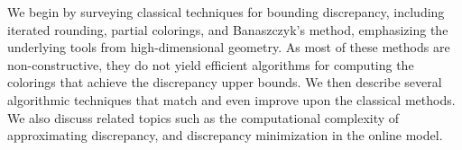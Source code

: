 \documentclass[11pt,oneside]{book}  %
\theoremstyle{plain}
\theoremstyle{definition}
\theoremstyle{remark}
\begin{document}
We begin by surveying classical techniques for bounding discrepancy, including iterated rounding, partial colorings, and Banaszczyk’s method, emphasizing the underlying tools from high-dimensional geometry. As most of these methods are non-constructive, they do not yield efficient algorithms for computing the colorings that achieve the discrepancy upper  bounds.
We then describe several algorithmic techniques
that match and even improve upon the classical methods.
We also discuss related topics such as the computational complexity of approximating discrepancy, and discrepancy minimization in the online model.




\end{document}
